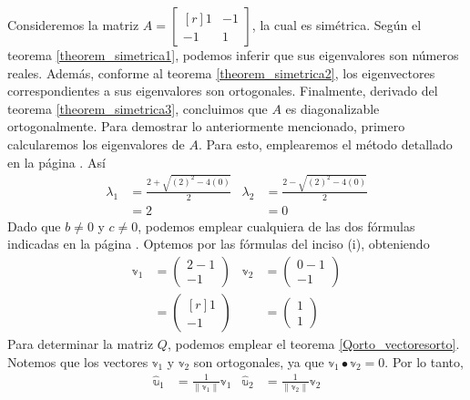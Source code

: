 \begin{example}
    Consideremos la matriz $A = \begin{bmatrix*}[r]
        1 & -1 \\
        -1 & 1
    \end{bmatrix*}$, la cual es simétrica. Según el teorema \ref{theorem_simetrica1}, podemos inferir que sus eigenvalores son números reales. Además, conforme al teorema \ref{theorem_simetrica2}, los eigenvectores correspondientes a sus eigenvalores son ortogonales. Finalmente, derivado del teorema \ref{theorem_simetrica3}, concluimos que $A$ es diagonalizable ortogonalmente. Para demostrar lo anteriormente mencionado, primero calcularemos los eigenvalores de $A$. Para esto, emplearemos el método detallado en la página \pageref{metodo_eigen_2x2}. Así
    \begin{align*}
        \lambda_1 & = \frac{2 + \sqrt{(2)^2 - 4(0)}}{2} & \lambda_2 & = \frac{2 - \sqrt{(2)^2 - 4(0)}}{2} \\
        & = 2 & & = 0
    \end{align*}
    Dado que $b \neq 0$ y $c \neq 0$, podemos emplear cualquiera de las dos fórmulas indicadas en la página \pageref{metodo_eigen_2x2}. Optemos por las fórmulas del inciso (i), obteniendo
    \begin{align*}
        \mathbb{v}_1 & = \begin{pmatrix} 2 - 1 \\ - 1 \end{pmatrix} & \mathbb{v}_2 & = \begin{pmatrix} 0 - 1 \\ - 1 \end{pmatrix} \\
        & = \begin{pmatrix*}[r] 1 \\ -1 \end{pmatrix*} & & = \begin{pmatrix} 1 \\ 1 \end{pmatrix}
    \end{align*}\newpage\noindent
    Para determinar la matriz $Q$, podemos emplear el teorema \ref{Qorto_vectoresorto}. Notemos que los vectores $\mathbb{v}_1$ y $\mathbb{v}_2$ son ortogonales, ya que $\mathbb{v}_1 \bullet \mathbb{v}_2 = 0$. Por lo tanto,
    \begin{align*}
        \hat{\mathbb{u}}_1 & = \frac{1}{\| \mathbb{v}_1 \|} \mathbb{v}_1 & \hat{\mathbb{u}}_2 & = \frac{1}{\| \mathbb{v}_2 \|} \mathbb{v}_2 \\

\end{align*}
\end{example}
